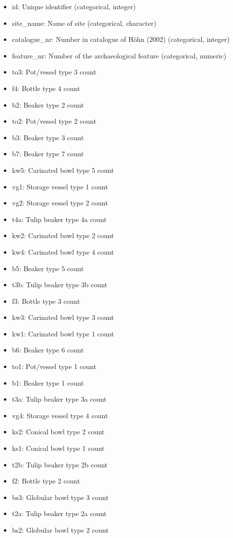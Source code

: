 \documentclass[a3, ruledsections, 8pt]{sciposter}
\begin{document}
\begin{itemize}
\item id: Unique identifier (categorical, integer)
\item site\_name: Name of site (categorical, character)
\item catalogue\_nr: Number in catalogue of Höhn (2002) (categorical, integer)
\item feature\_nr: Number of the archaeological feature (categorical, numeric)
\item to3: Pot/vessel type 3 count
\item f4: Bottle type 4 count
\item b2: Beaker type 2 count
\item to2: Pot/vessel type 2 count
\item b3: Beaker type 3 count
\item b7: Beaker type 7 count
\item kw5: Carinated bowl type 5 count
\item vg1: Storage vessel type 1 count
\item vg2: Storage vessel type 2 count
\item t4a: Tulip beaker type 4a count
\item kw2: Carinated bowl type 2 count
\item kw4: Carinated bowl type 4 count
\item b5: Beaker type 5 count
\item t3b: Tulip beaker type 3b count
\item f3: Bottle type 3 count
\item kw3: Carinated bowl type 3 count
\item kw1: Carinated bowl type 1 count
\item b6: Beaker type 6 count
\item to1: Pot/vessel type 1 count
\item b1: Beaker type 1 count
\item t3a: Tulip beaker type 3a count
\item vg4: Storage vessel type 4 count
\item ks2: Conical bowl type 2 count
\item ks1: Conical bowl type 1 count
\item t2b: Tulip beaker type 2b count
\item f2: Bottle type 2 count
\item bs3: Globular bowl type 3 count
\item t2a: Tulip beaker type 2a count
\item bs2: Globular bowl type 2 count

\end{itemize}
\end{document}
